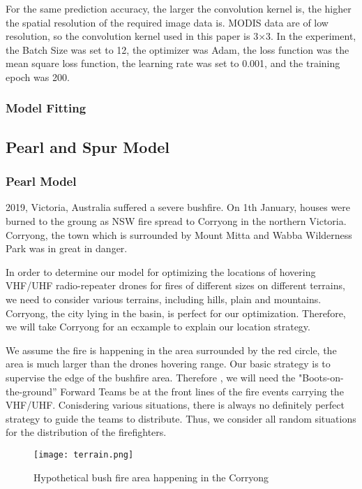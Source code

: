 \documentclass[../main]{subfiles}
\begin{document}
  For the same prediction accuracy, the larger the convolution kernel is, 
  the higher the spatial resolution of the required image data is. 
  MODIS data are of low resolution, so the convolution kernel used in this paper is 3×3. In the experiment,
   the Batch Size was set to 12, the optimizer was Adam, the loss function was the mean square loss function, 
   the learning rate was set to 0.001, and the training epoch was 200.
\hypertarget{model-fitting}{%
\subsubsection{Model Fitting}\label{model-fitting}}



\subsection{Pearl and Spur Model}
\subsubsection{Pearl Model}

2019, Victoria, Australia suffered a severe bushfire. On 1th January,
houses were burned to the groung as NSW fire spread to Corryong in the
northern Victoria. Corryong, the town which is surrounded by Mount Mitta
and Wabba Wilderness Park was in great in danger.

In order to determine our model for optimizing the locations of hovering
VHF/UHF radio-repeater drones for fires of different sizes on different
terrains, we need to consider various terrains, including hills, plain
and mountains. Corryong, the city lying in the basin, is perfect for our
optimization. Therefore, we will take Corryong for an ecxample to
explain our location strategy.

We assume the fire is happening in the area surrounded by the red
circle, the area is much larger than the drones hovering range. Our
basic strategy is to supervise the edge of the bushfire area. Therefore
, we will need the "Boots-on-the-ground'' Forward Teams be at the front
lines of the fire events carrying the VHF/UHF. Conisdering various
situations, there is always no definitely perfect strategy to guide the
teams to distribute. Thus, we consider all random situations for the
distribution of the firefighters.

\begin{figure}[h!]
      \centering
      \texttt{[image: terrain.png]}
      \caption{Hypothetical bush fire area happening in the Corryong}
    \end{figure}
\end{document}
